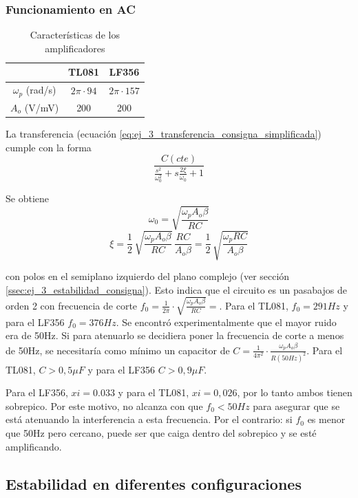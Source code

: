 \documentclass[../../main.tex]{subfiles}
\begin{document}
\subsubsection{Funcionamiento en AC}

\begin{table}[htbp]
\centering
\begin{tabular}{ccllcll}
                   & \multicolumn{3}{c}{TL081}         & \multicolumn{3}{c}{LF356}          \\
\hline
$\omega _p$ (rad/s) & \multicolumn{3}{c}{$2\pi \cdot 94$} & \multicolumn{3}{c}{$2\pi \cdot 157$} \\
$A_o$ (V/mV)       & \multicolumn{3}{c}{200}           & \multicolumn{3}{c}{200}           
\end{tabular}
\caption{Caracter\'isticas de los amplificadores}
\label{tab:ej_1_}
\end{table}


La transferencia (ecuaci\'on \ref{eq:ej_3_transferencia_consigna_simplificada}) cumple con la forma 
\[\frac{C(cte)}{\frac{s^2}{\omega_0^2}+s\frac{2\xi}{\omega_0}+1}\]

Se obtiene
\[\omega _0 = \sqrt{\frac{\omega_pA_o\beta}{RC}}\]
\[\xi=\frac{1}{2}\,\sqrt{\frac{\omega_pA_o\beta}{RC}}\,\frac{RC}{A_o\beta}=\frac{1}{2}\,\sqrt{\frac{\omega_pRC}{A_o\beta}}\]


con polos en el semiplano izquierdo del plano complejo (ver secci\'on \ref{ssec:ej_3_estabilidad_consigna}). Esto indica que el circuito es un pasabajos de orden 2 con frecuencia de corte $f_0=\frac{1}{2\pi}\cdot \sqrt{\frac{\omega_pA_o\beta}{RC}}=$. Para el TL081, $f_0=291Hz$ y para el LF356 $f_0=376Hz$. Se encontr\'o experimentalmente que el mayor ruido era de 50Hz. Si para atenuarlo se decidiera poner la frecuencia de corte a menos de 50Hz, se necesitar\'ia como m\'inimo un capacitor de $C=\frac{1}{4\pi^2}\cdot \frac{\omega_pA_o\beta}{R(50Hz)^2}$. Para el TL081, $C>0,5\mu F$ y para el LF356 $C>0,9 \mu F$.

Para el LF356, $xi = 0.033$ y para el TL081, $xi = 0,026$, por lo tanto ambos tienen sobrepico. Por este motivo, no alcanza con que $f_0<50Hz$ para asegurar que se est\'a atenuando la interferencia a esta frecuencia. Por el contrario: si $f_0$ es menor que 50Hz pero cercano, puede ser que caiga dentro del sobrepico y se est\'e amplificando.





\subsection{Estabilidad en diferentes configuraciones} 
\end{document}
